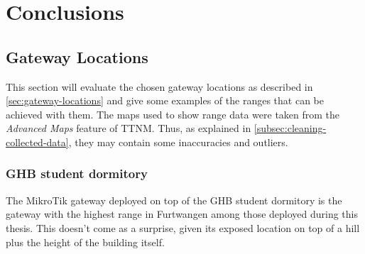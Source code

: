\chapter{Conclusions}

\section{Gateway Locations}\label{sec:gateway-locations-conclusions}

This section will evaluate the chosen gateway locations as described in \cref{sec:gateway-locations} and give some examples of the ranges that can be achieved with them.
The maps used to show range data were taken from the \emph{Advanced Maps} feature of \ac{TTNM}.
Thus, as explained in \cref{subsec:cleaning-collected-data}, they may contain some inaccuracies and outliers.

\subsection{\acf{GHB} student dormitory}\label{subsec:ghb-student-dormitory-range-results}

The MikroTik gateway deployed on top of the \ac{GHB} student dormitory is the gateway with the highest range in Furtwangen among those deployed during this thesis.
This doesn't come as a surprise, given its exposed location on top of a hill plus the height of the building itself.


